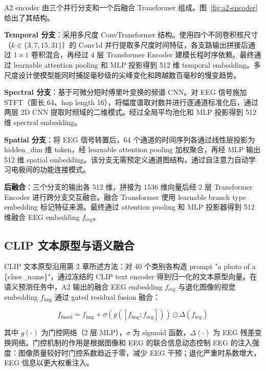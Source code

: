 A2 encoder 由三个并行分支和一个后融合 Transformer 组成。图~\ref{fig:a2-encoder} 给出了其结构。


\textbf{Temporal 分支}：采用多尺度 ConvTransformer 结构。使用四个不同卷积核尺寸（$k \in \{3, 7, 15, 31\}$）的 Conv1d 并行提取多尺度时间特征，各支路输出拼接后通过 $1\times1$ 卷积混合，再经过 4 层 Transformer Encoder 建模长程时序依赖。最终通过 learnable attention pooling 和 MLP 投影得到 512 维 temporal embedding。多尺度设计使模型能同时捕捉毫秒级的尖峰变化和跨越数百毫秒的慢变趋势。

\textbf{Spectral 分支}：基于可微分短时傅里叶变换的频谱 CNN。对 EEG 信号施加 STFT（窗长 64、hop length 16），将幅度谱取对数并进行逐通道标准化后，通过两层 2D CNN 提取时频域的二维模式。经过全局平均池化和 MLP 投影得到 512 维 spectral embedding。

\textbf{Spatial 分支}：将 EEG 信号转置后，64 个通道的时间序列各通过线性层投影为 hidden\_dim 维 token，经 learnable attention pooling 加权聚合，再经 MLP 输出 512 维 spatial embedding。该分支无需预定义通道图结构，通过自注意力自动学习电极间的功能连接模式。

\textbf{后融合}：三个分支的输出各 512 维，拼接为 1536 维向量后经 2 层 Transformer Encoder 进行跨分支交互融合。融合 Transformer 使用 learnable branch type embedding 标记特征来源。最终通过 attention pooling 和 MLP 投影器得到 512 维融合 EEG embedding $f_{\mathrm{eeg}}$。

\subsection{CLIP 文本原型与语义融合}

CLIP 文本原型沿用第 2 章所述方法：对 40 个类别各构造 prompt "a photo of a \{class\_name\}"，通过冻结的 CLIP text encoder 得到归一化的文本原型向量。在语义预测任务中，A2 输出的融合 EEG embedding $f_{\mathrm{eeg}}$ 与退化图像的视觉 embedding $f_{\mathrm{img}}$ 通过 gated residual fusion 融合：

\begin{equation}
  f_{\mathrm{fused}} = f_{\mathrm{img}} + \sigma\left(g\left([f_{\mathrm{img}}; f_{\mathrm{eeg}}]\right)\right) \odot \Delta(f_{\mathrm{eeg}})
\end{equation}

其中 $g(\cdot)$ 为门控网络（2 层 MLP），$\sigma$ 为 sigmoid 函数，$\Delta(\cdot)$ 为 EEG 残差变换网络。门控机制的作用是根据图像和 EEG 的联合信息动态控制 EEG 的注入强度：图像质量较好时门控系数趋近于零，减少 EEG 干预；退化严重时系数增大，EEG 信息以更大权重注入。

